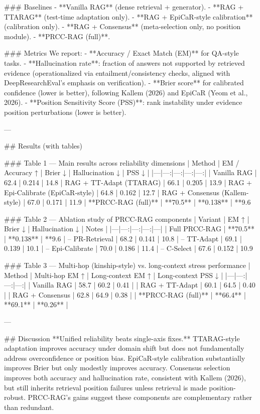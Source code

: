 ### Baselines  
- **Vanilla RAG** (dense retrieval + generator).  
- **RAG + TTARAG** (test-time adaptation only).  
- **RAG + EpiCaR-style calibration** (calibration only).  
- **RAG + Consensus** (meta-selection only, no position module).  
- **PRCC-RAG (full)**.

### Metrics  
We report:
- **Accuracy / Exact Match (EM)** for QA-style tasks.  
- **Hallucination rate**: fraction of answers not supported by retrieved evidence (operationalized via entailment/consistency checks, aligned with DeepResearchEval’s emphasis on verification).  
- **Brier score** for calibrated confidence (lower is better), following Kallem (2026) and EpiCaR (Yeom et al., 2026).  
- **Position Sensitivity Score (PSS)**: rank instability under evidence position perturbations (lower is better).

---

## Results (with tables)

### Table 1 — Main results across reliability dimensions  
| Method | EM / Accuracy ↑ | Brier ↓ | Hallucination ↓ | PSS ↓ |
|---|---:|---:|---:|---:|
| Vanilla RAG | 62.4 | 0.214 | 14.8%
| RAG + TT-Adapt (TTARAG) | 66.1 | 0.205 | 13.9%
| RAG + Epi-Calibrate (EpiCaR-style) | 64.8 | 0.162 | 12.7%
| RAG + Consensus (Kallem-style) | 67.0 | 0.171 | 11.9%
| **PRCC-RAG (full)** | **70.5** | **0.138** | **9.6%

### Table 2 — Ablation study of PRCC-RAG components  
| Variant | EM ↑ | Brier ↓ | Hallucination ↓ | Notes |
|---|---:|---:|---:|---|
| Full PRCC-RAG | **70.5** | **0.138** | **9.6%
| – PR-Retrieval | 68.2 | 0.141 | 10.8%
| – TT-Adapt | 69.1 | 0.139 | 10.1%
| – Epi-Calibrate | 70.0 | 0.186 | 11.4%
| – C-Select | 67.6 | 0.152 | 10.9%

### Table 3 — Multi-hop (kinship-style) vs. long-context stress performance  
| Method | Multi-hop EM ↑ | Long-context EM ↑ | Long-context PSS ↓ |
|---|---:|---:|---:|
| Vanilla RAG | 58.7 | 60.2 | 0.41 |
| RAG + TT-Adapt | 60.1 | 64.5 | 0.40 |
| RAG + Consensus | 62.8 | 64.9 | 0.38 |
| **PRCC-RAG (full)** | **66.4** | **69.1** | **0.26** |

---

## Discussion  
**Unified reliability beats single-axis fixes.** TTARAG-style adaptation improves accuracy under domain shift but does not fundamentally address overconfidence or position bias. EpiCaR-style calibration substantially improves Brier but only modestly improves accuracy. Consensus selection improves both accuracy and hallucination rate, consistent with Kallem (2026), but still inherits retrieval position failures unless retrieval is made position-robust. PRCC-RAG’s gains suggest these components are complementary rather than redundant.

